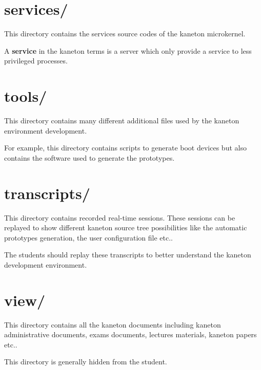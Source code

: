 %
%

\section{services/}

This directory contains the services source codes of the kaneton
microkernel.

A \textbf{service} in the kaneton terms is a server which only
provide a service to less privileged processes.

%
%

\section{tools/}

This directory contains many different additional files used by
the kaneton environment development.

For example, this directory contains scripts to generate boot devices
but also contains the software used to generate the prototypes.

%
%

\section{transcripts/}

This directory contains recorded real-time sessions. These sessions
can be replayed to show different kaneton source tree possibilities
like the automatic prototypes generation, the user configuration file
etc..

The students should replay these transcripts to better understand
the kaneton development environment.

%
%

\section{view/}

This directory contains all the kaneton documents including kaneton
administrative documents, exams documents, lectures materials,
kaneton papers etc..

This directory is generally hidden from the student.
